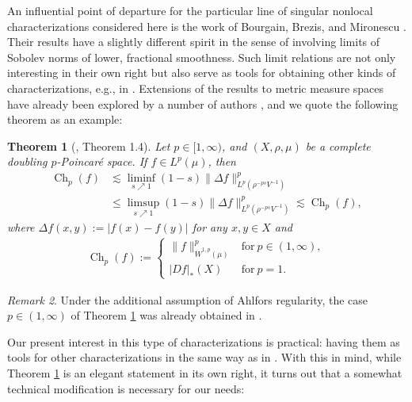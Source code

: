 \documentclass[11pt]{amsart}
\newtheorem{theorem}{Theorem}[section]
\theoremstyle{definition}
\theoremstyle{remark}
\newtheorem{remark}[theorem]{Remark}
\numberwithin{equation}{section}
\newcommand{\abs}[1]{|#1|}
\newcommand{\Norm}[2]{\|#1\|_{#2}}
\begin{document}
An influential point of departure for the particular line of singular nonlocal
characterizations considered here is the work of Bourgain, Brezis, and Mironescu \cite{BBM}.
Their results have a slightly different spirit in the sense of involving limits of Sobolev
norms of lower, fractional smoothness. Such limit relations are not only interesting in
their own right but also serve as tools for obtaining other kinds of characterizations,
e.g., in \cite[Section 4]{BSVY}. Extensions of the \cite{BBM} results to metric measure
spaces have already been explored by a number of authors \cite{DMS,Munnier}, and we quote
the following theorem as an example:

\begin{theorem}[\cite{DMS}, Theorem 1.4]\label{thm:DMS}
Let $p\in[1,\infty)$, and $(X,\rho,\mu)$ be a complete doubling $p$-Poincar\'e space.
If $f\in L^p(\mu)$, then
\begin{subequations}\label{eq:DMS}
\begin{align}
  {\operatorname{Ch}}_p(f)
  &\lesssim
  \liminf_{s\nearrow 1}(1-s)\Norm{\Delta f}{L^{p}(\rho^{-ps}V^{-1})}^p
    \label{eq:DMS-lower} \\
  &\leq
  \limsup_{s\nearrow 1}(1-s)\Norm{\Delta f}{L^{p}(\rho^{-ps}V^{-1})}^p
   \lesssim{\operatorname{Ch}}_p(f),
   \label{eq:DMS-upper}
\end{align}
\end{subequations}
where $\Delta f(x,y):=\abs{f(x)-f(y)}$ for any $x,y\in X$ and
\begin{align*}
{\operatorname{Ch}}_p(f):=
\begin{cases}\Norm{f}{\dot W^{1,p}(\mu)}^p & \text{for}\ p\in(1,\infty), \\
|Df|_*(X) & \text{for}\ p=1.\end{cases}
\end{align*}
\end{theorem}

\begin{remark}
Under the additional assumption of Ahlfors regularity, the case $p\in(1,\infty)$ of Theorem
\ref{thm:DMS} was already obtained in \cite[Theorem 2]{Munnier}.
\end{remark}

 Our present interest in this type of characterizations is practical: having them as tools
 for other characterizations in the same way as in \cite[Section 4]{BSVY}. With this in
 mind, while Theorem \ref{thm:DMS} is an elegant statement in its own right, it turns out
 that a somewhat technical modification is necessary for our needs:
\end{document}
